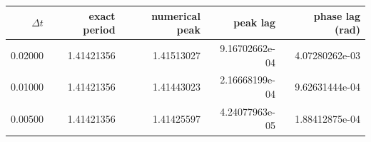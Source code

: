 \begin{center}
\small
\begin{tabular}{rrrrr}
\toprule
$\Delta t$ & exact period & numerical peak & peak lag & phase lag (rad) \\
\midrule
0.02000 & 1.41421356 & 1.41513027 & 9.16702662e-04 & 4.07280262e-03 \\
0.01000 & 1.41421356 & 1.41443023 & 2.16668199e-04 & 9.62631444e-04 \\
0.00500 & 1.41421356 & 1.41425597 & 4.24077963e-05 & 1.88412875e-04 \\
\bottomrule
\end{tabular}
\end{center}

